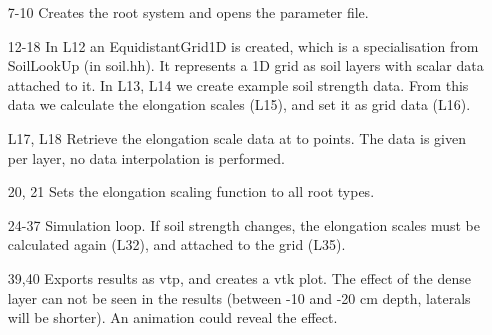 \begin{itemize}

\item[7-10] Creates the root system and opens the parameter file.

\item[12-18] In L12 an EquidistantGrid1D is created, which is a specialisation from SoilLookUp (in soil.hh). It represents a 1D grid as soil layers with scalar data attached to it. In L13, L14 we create example soil strength data. From this data we calculate the elongation scales (L15), and set it as grid data (L16). 

\item[L17, L18] Retrieve the elongation scale data at to points. The data is given per layer, no data interpolation is performed.

\item[20, 21] Sets the elongation scaling function to all root types.

\item[24-37] Simulation loop. If soil strength changes, the elongation scales must be calculated again (L32), and attached to the grid (L35).

\item[39,40] Exports results as vtp, and creates a vtk plot. The effect of the dense layer can not be seen in the results (between -10 and -20 cm depth, laterals will be shorter). An animation could reveal the effect. 

\end{itemize}

